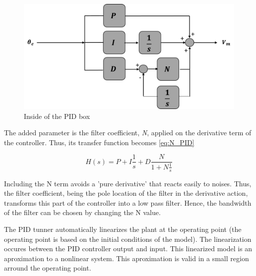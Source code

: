 \begin{figure}[H]
\centering
\includegraphics[scale=0.4]{figures/controller_box.png}
\caption{Inside of the PID box}
\label{PID_box_N}
\end{figure}

The added parameter is the filter coefficient, \textit{N}, applied on the derivative term of the controller. Thus, its transfer function becomes \ref{eq:N_PID}

\begin{equation}\label{eq:N_PID}
H(s) = P + I\frac{1}{s} + D\frac{N}{1+N\frac{1}{s}}
\end{equation}

Including the N term avoids a 'pure derivative' that reacts easily to noises. Thus, the filter coefficient, being the pole location of the filter in the derivative action, transforms this part of the controller into a low pass filter. Hence, the bandwidth of the filter can be chosen by changing the N value.\par

\vspace{5mm}

The PID tunner automatically linearizes the plant at the operating point (the operating point is based on the initial conditions of the model). The linearization occures between the PID controller output and input. This linearized model is an aproximation to a nonlinear system. This aproximation is valid in a small region arround the operating point.

